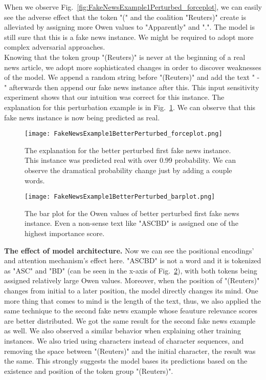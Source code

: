 When we observe Fig.~\ref{fig:FakeNewsExample1Perturbed_forceplot}, we can easily see the adverse effect that the token "(" and the coalition "Reuters)" create is alleviated by assigning more Owen values to "Apparently" and ".". The model is still sure that this is a fake news instance. We might be required to adopt more complex adversarial approaches.\\
Knowing that the token group "(Reuters)" is never at the beginning of a real news article, we adopt more sophisticated changes in order to discover weaknesses of the model. We append a random string before "(Reuters)" and add the text " - " afterwards then append our fake news instance after this. This input sensitivity experiment shows that our intuition was correct for this instance. The explanation for this perturbation example is in Fig.~\ref{fig:FakeNewsExample1BetterPerturbed_forceplot}. We can observe that this fake news instance is now being predicted as real.\\
\begin{figure}
    \centering
    \texttt{[image: FakeNewsExample1BetterPerturbed\_forceplot.png]}
    \caption[The explanation for the better perturbed first fake news instance.]{The explanation for the better perturbed first fake news instance. This instance was predicted real with over 0.99 probability. We can observe the dramatical probability change just by adding a couple words.}
    \label{fig:FakeNewsExample1BetterPerturbed_forceplot}
\end{figure}
\begin{figure}
    \centering
    \texttt{[image: FakeNewsExample1BetterPerturbed\_barplot.png]}
    \caption[The bar plot for the Owen values of better perturbed first fake news instance.]{The bar plot for the Owen values of better perturbed first fake news instance. Even a non-sense text like "ASCBD" is assigned one of the highest importance score.}
    \label{fig:FakeNewsExample1BetterPerturbed_barplot}
\end{figure}
\textbf{The effect of model architecture.} Now we can see the positional encodings' and attention mechanism's effect here. "ASCBD" is not a word and it is tokenized as "ASC" and "BD" (can be seen in the x-axis of Fig.~\ref{fig:FakeNewsExample1BetterPerturbed_barplot}), with both tokens being assigned relatively large Owen values. Moreover, when the position of "(Reuters)" changes from initial to a later position, the model directly changes its mind. One more thing that comes to mind is the length of the text, thus, we also applied the same technique to the second fake news example whose feauture relevance scores are better distributed. We got the same result for the second fake news example as well. We also observed a similar behavior when explaining other training instances. We also tried using characters instead of character sequences, and removing the space between "(Reuters)" and the initial character, the result was the same. This strongly suggests the model bases its predictions based on the existence and position of the token group "(Reuters)".\\
